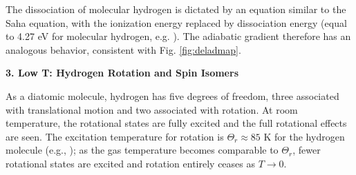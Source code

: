 \documentclass[apj]{emulateapj}
\newcommand{\delad}{\nabla_{\rm ad}}
\newcommand{\App}[1]{Appendix~\ref{#1}}
\begin{document}
The dissociation of molecular hydrogen is dictated by an equation similar to the Saha equation, with the ionization energy replaced by dissociation energy (equal to 4.27 eV for molecular hydrogen, e.g. \citealt{mandl89}). The adiabatic gradient therefore has an analogous behavior, consistent with Fig. \ref{fig:deladmap}.





\vspace{0.2in}

\textbf{3. Low T: Hydrogen Rotation and Spin Isomers}

As a diatomic molecule, hydrogen has five degrees of freedom, three associated with translational motion and two associated with rotation. At room temperature, the rotational states are fully excited and the full rotational effects are seen. The excitation temperature for rotation is $\Theta_r \approx 85$ K for the hydrogen molecule (e.g., \citealt{kittel}); as the gas temperature becomes comparable to $\Theta_r$, fewer rotational states are excited and rotation entirely ceases as $T \rightarrow 0$. %
\end{document}
